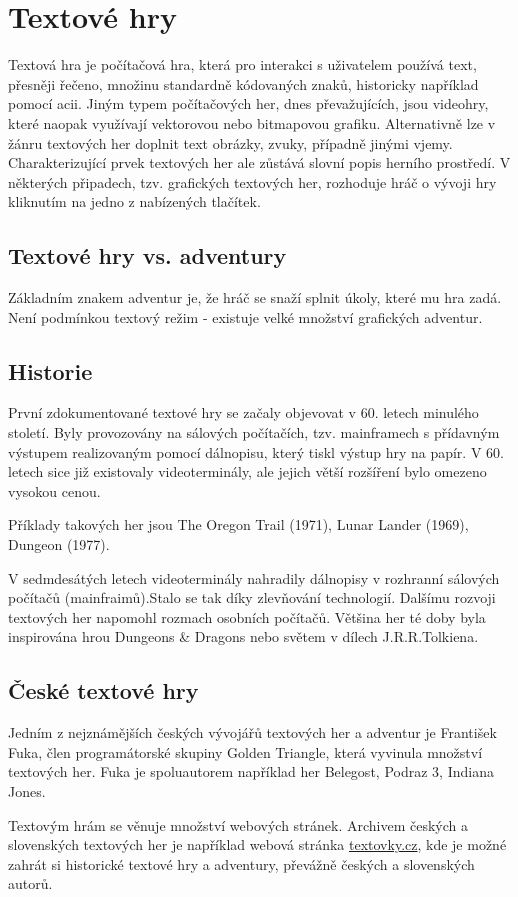 \documentclass[main.tex]{subfiles}
\begin{document}
\section{Textové hry}
Textová hra je počítačová hra, která pro interakci s uživatelem používá text, přesněji řečeno, množinu standardně kódovaných znaků, historicky například pomocí acii. Jiným typem počítačových her, dnes převažujících, jsou videohry, které naopak využívají vektorovou nebo bitmapovou grafiku. \cite{web:wik:en:textgame} Alternativně lze v žánru textových her doplnit text obrázky, zvuky, případně jinými vjemy. Charakterizující prvek textových her ale zůstává slovní popis herního prostředí. V některých připadech, tzv. grafických textových her, rozhoduje hráč o vývoji hry kliknutím na jedno z nabízených tlačítek.\cite{web:wik:cz:textovahra}

\subsection{Textové hry vs. adventury}
Základním znakem adventur je, že hráč se snaží splnit úkoly, které mu hra zadá. Není podmínkou textový režim - existuje velké množství grafických adventur. \cite{web:wik:cz:adventura}

\subsection{Historie}
První zdokumentované textové hry se začaly objevovat v 60. letech minulého století. Byly provozovány na sálových počítačích, tzv. mainframech s přídavným výstupem realizovaným pomocí dálnopisu, který tiskl výstup hry na papír. V 60. letech sice již existovaly videoterminály, ale jejich větší rozšíření bylo omezeno vysokou cenou. \cite{web:pcmag:en:oldcomputergames, web:wik:en:textgame}


Příklady takových her jsou The Oregon Trail (1971), Lunar Lander (1969), Dungeon (1977). \cite{web:pcmag:en:oldcomputergames}

V sedmdesátých letech videoterminály nahradily dálnopisy v rozhranní sálových počítačů (mainfraimů).Stalo se tak díky zlevňování technologií. Dalšímu rozvoji textových her napomohl rozmach osobních počítačů. Většina her té doby byla inspirována hrou Dungeons \& Dragons nebo světem v dílech J.R.R.Tolkiena. \cite{web:pcgamer:en:historyofrpgs}  


\subsection{České textové hry}
Jedním z nejznámějších českých vývojářů textových her a adventur je František Fuka, člen programátorské skupiny Golden Triangle, která vyvinula množství textových her. Fuka je spoluautorem například her Belegost, Podraz 3, Indiana Jones.

Textovým hrám se věnuje množství webových stránek. Archivem českých a slovenských textových her je například webová stránka \href{https://www.textovky.cz}{textovky.cz}, kde je možné zahrát si historické textové hry a adventury, převážně českých a slovenských autorů. \cite{web:text:cz:archiv}
\end{document}
